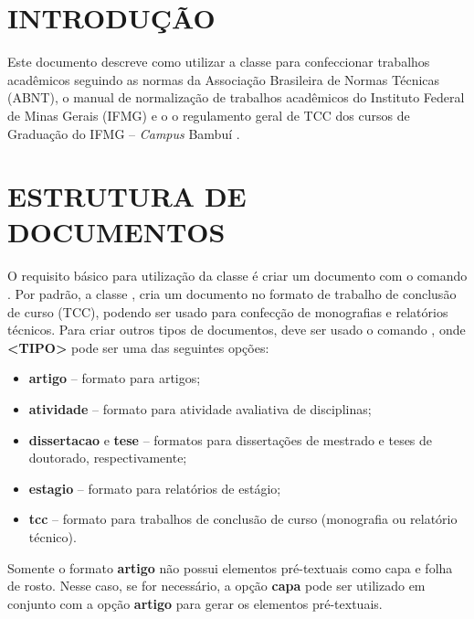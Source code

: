 \documentclass[artigo]{iftex2024}
\begin{document}
\maketitle
\newpage
\geraSumario

\section{INTRODUÇÃO}

Este documento descreve como utilizar a classe {\iftex} para confeccionar trabalhos acadêmicos seguindo as normas da Associação Brasileira de Normas Técnicas (ABNT), o manual de normalização de trabalhos acadêmicos do Instituto Federal de Minas Gerais (IFMG) \cite{ifmg:2020:manual} e o o regulamento geral de TCC dos cursos de Graduação do IFMG -- \textit{Campus} Bambuí \cite{ifmg:2021:tcc}.

\section{ESTRUTURA DE DOCUMENTOS}

O requisito básico para utilização da classe {\iftex} é criar um documento com o comando .
Por padrão, a classe {\iftex}, cria um documento no formato de trabalho de conclusão de curso (TCC), podendo ser usado para confecção de monografias e relatórios técnicos.
Para criar outros tipos de documentos, deve ser usado o comando , onde \textbf{<TIPO>} pode ser uma das seguintes opções:
\begin{itemize}
  \item[] \textbf{artigo} -- formato para artigos;
  \item[] \textbf{atividade} -- formato para atividade avaliativa de disciplinas;
  \item[] \textbf{dissertacao} e \textbf{tese} -- formatos para dissertações de mestrado e teses de doutorado, respectivamente;
  \item[] \textbf{estagio} -- formato para relatórios de estágio;
  \item[] \textbf{tcc} -- formato para trabalhos de conclusão de curso (monografia ou relatório técnico).
\end{itemize}

Somente o formato \textbf{artigo} não possui elementos pré-textuais como capa e folha de rosto.
Nesse caso, se for necessário, a opção \textbf{capa} pode ser utilizado em conjunto com a opção \textbf{artigo} para gerar os elementos pré-textuais.
\end{document}
